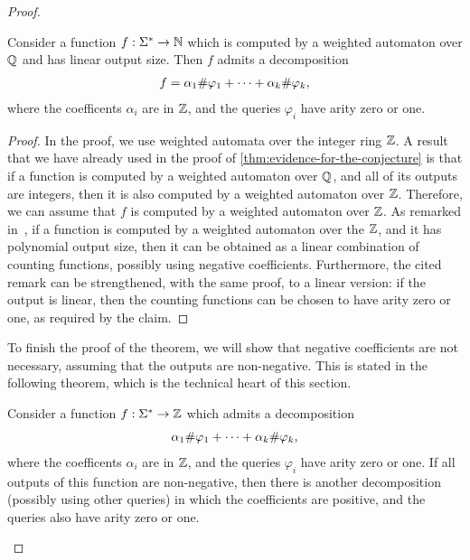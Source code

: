\begin{proof}
\begin{claim}\label{claim:mso-counting-regular-with-negative}
    Consider a function $f : \Sigma^* \to {\mathbb N}$ which is computed by a weighted automaton over ${\mathbb Q}$ and has linear output size. Then $f$ admits a decomposition 
    \begin{align*}
    f = \alpha_1 \#{\varphi_1} + \cdots +  \alpha_k \#{\varphi_k},
    \end{align*}        
        where the coefficents $\alpha_i$ are in ${\mathbb Z}$, and the queries $\varphi_i$ have arity zero or one.
\end{claim}
\begin{proof}
    In the proof, we use weighted automata over the integer ring ${\mathbb Z}$. A result that we have already used in the proof of \cref{thm:evidence-for-the-conjecture} is that if a function is computed by a weighted automaton over ${\mathbb Q}$, and all of its outputs are integers,  then it is also computed by a weighted automaton over ${\mathbb Z}$. Therefore, we can assume that $f$ is computed by a weighted automaton over ${\mathbb Z}$.
    As remarked in~\cite[Remark II.21]{Zpolyreg23}, if a function is computed by a weighted automaton over the ${\mathbb Z}$, and it has polynomial output size, then it can be obtained as a linear combination of \mso counting functions, possibly using negative coefficients. Furthermore, the cited remark can be strengthened, with the same proof, to a linear version: if the output is linear, then the \mso counting functions can be chosen to have arity zero or one, as required by the claim.
\end{proof}

To finish the proof of the theorem, we will show that negative coefficients are not necessary, assuming that the outputs are non-negative. This is stated in the following theorem, which is the technical heart of this section.
\begin{theorem}\label{thm:int-to-nat}
    Consider a function $f : \Sigma^* \to  {\mathbb Z}$ which admits a decomposition
    \begin{align*}
 \alpha_1 \#{\varphi_1} + \cdots +  \alpha_k \#{\varphi_k},
    \end{align*}        
        where the coefficents $\alpha_i$ are in ${\mathbb Z}$, and the queries $\varphi_i$ have arity zero or one. If all outputs of this function are non-negative, then there is another decomposition (possibly using other queries) in which the coefficients are positive, and the queries also have arity zero or one.
\end{theorem}


\end{proof}
